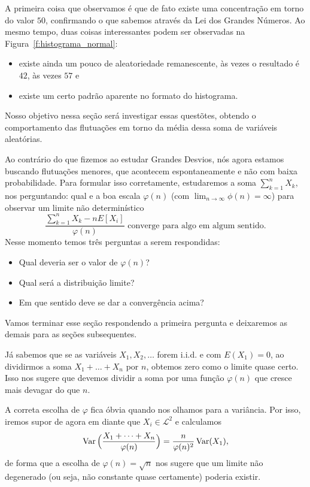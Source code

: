 A primeira coisa que observamos é que de fato existe uma concentração em torno do valor $50$, confirmando o que sabemos através da Lei dos Grandes Números.
Ao mesmo tempo, duas coisas interessantes podem ser observadas na Figura~\ref{f:histograma_normal}:
\begin{itemize}
\item existe ainda um pouco de aleatoriedade remanescente, às vezes o resultado é $42$, às vezes $57$ e
\item existe um certo padrão aparente no formato do histograma.
\end{itemize}
Nosso objetivo nessa seção será investigar essas questõtes, obtendo o comportamento das flutuações em torno da média dessa soma de variáveis aleatórias.

Ao contrário do que fizemos ao estudar Grandes Desvios, nós agora estamos buscando flutuações menores, que acontecem espontaneamente e não com baixa probabilidade.
Para formular isso corretamente, estudaremos a soma $\sum_{k=1}^n X_k$, nos perguntando: qual e a boa escala $\varphi(n)$ (com $\lim_{n\to \infty}\phi(n)=\infty$)
para observar um limite não determinístico
$$\frac{\sum_{k=1}^n X_k - nE[X_i]}{\varphi(n)} \text{ converge para algo em algum sentido}.$$
Nesse momento temos três perguntas a serem respondidas:
\begin{itemize}
\item Qual deveria ser o valor de $\varphi(n)$?
\item Qual será a distribuição limite?
\item Em que sentido deve se dar a convergência acima?
\end{itemize}
Vamos terminar esse seção respondendo a primeira pergunta e deixaremos as demais para as seções subsequentes.

\bigskip

Já sabemos que se as variáveis $X_1, X_2, \dots$ forem i.i.d. e com $E(X_1) = 0$, ao dividirmos a soma $X_1 + \dots + X_n$ por $n$, obtemos zero como o limite quase certo.
Isso nos sugere que devemos dividir a soma por uma função $\varphi(n)$ que cresce mais devagar do que $n$.

A correta escolha de $\varphi$ fica óbvia quando nos olhamos para a variância.
Por isso, iremos supor de agora em diante que $X_i \in \mathcal{L}^2$ e calculamos
\begin{equation}
  \operatorname{Var} \Big( \frac{X_1 + \dots + X_n}{\varphi(n)} \Big)
  = \frac{n}{\varphi(n)^2} \operatorname{Var}(X_1),
\end{equation}
de forma que a escolha de $\varphi(n) = \sqrt{n}$ nos sugere que um limite não degenerado (ou seja, não constante quase certamente) poderia existir.

